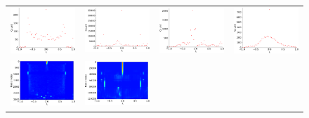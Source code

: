 \documentclass[senior,final,11pt]{iscs-thesis}
\begin{document}
\begin{figure}[htbp]
  \setlength\tabcolsep{0pt}
  \hspace{-3.0cm}
  \begin{tabular}{cccc}
    \includegraphics[width=45mm]{figure/web-edumtx_dos.png} &
    \includegraphics[width=45mm]{figure/web-sk-2005mtx_dos.png} &
    \includegraphics[width=45mm]{figure/web-indochina-2004mtx_dos.png} &
    \includegraphics[width=45mm]{figure/web-spammtx_dos.png} \\
    \includegraphics[width=45mm]{figure/web-edumtx_pdos.png} &
    \includegraphics[width=45mm]{figure/web-sk-2005mtx_pdos.png} &

\end{tabular}
\end{figure}
\end{document}
